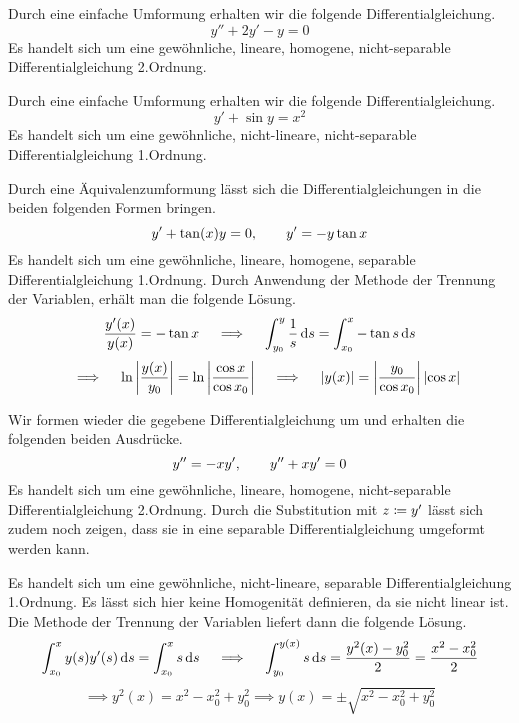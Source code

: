 \begin{atiSolution}
	\begin{atiSubtaskSolutions}
		\item[\localref{dgl1}]{
			Durch eine einfache Umformung erhalten wir die folgende Differentialgleichung.
			\[
				y'' + 2y' -y = 0
			\]
			Es handelt sich um eine gewöhnliche, lineare, homogene, nicht-separable Differentialgleichung 2.Ordnung.
		}
		\item[\localref{dgl2}]{
			Durch eine einfache Umformung erhalten wir die folgende Differentialgleichung.
			\[
				y'+ \sin y = x^2
			\]
			Es handelt sich um eine gewöhnliche, nicht-lineare, nicht-separable Differentialgleichung 1.Ordnung.
		}
		\item[\localref{dgl3}]{
			Durch eine Äquivalenzumformung lässt sich die Differentialgleichungen in die beiden folgenden Formen bringen.
			\[
				y' + \tan (x)y = 0 ,\qquad y' = -y\tan x
			\]
			Es handelt sich um eine gewöhnliche, lineare, homogene, separable Differentialgleichung 1.Ordnung.
			Durch Anwendung der Methode der Trennung der Variablen, erhält man die folgende Lösung.
			\[
				\frac{y'(x)}{y(x)} = -\tan x \implies \integral{y_0}{y}{\frac{1}{s}}{s} = \integral{x_0}{x}{-\tan s}{s}
			\]
			\[
				\implies \ln\abs{\frac{y(x)}{y_0}} = \ln\abs{\frac{\cos x}{\cos x_0}} \implies \abs{y(x)} = \abs{\frac{y_0}{\cos x_0}} \abs{\cos x}
			\]
		}
		\item[\localref{dgl4}]{
			Wir formen wieder die gegebene Differentialgleichung um und erhalten die folgenden beiden Ausdrücke.
			\[
				y'' = -xy' ,\qquad y'' + xy' = 0
			\]
			Es handelt sich um eine gewöhnliche, lineare, homogene, nicht-separable Differentialgleichung 2.Ordnung.
			Durch die Substitution mit $z\coloneqq y'$ lässt sich zudem noch zeigen, dass sie in eine separable Differentialgleichung umgeformt werden kann.
		}
		\item[\localref{dgl5}]{
			Es handelt sich um eine gewöhnliche, nicht-lineare, separable Differentialgleichung 1.Ordnung.
			Es lässt sich hier keine Homogenität definieren, da sie nicht linear ist.
			Die Methode der Trennung der Variablen liefert dann die folgende Lösung.
			\[
				\integral{x_0}{x}{y(s)y'(s)}{s} = \integral{x_0}{x}{s}{s} \implies \integral{y_0}{y(x)}{s}{s} = \frac{y^2(x)- y^2_0}{2} = \frac{x^2-x_0^2}{2}
			\]
			\[
				\implies y^2(x) = x^2 - x_0^2 + y_0^2 \implies y(x) = \pm\sqrt{x^2-x_0^2+y_0^2}
			\]

}
\end{atiSubtaskSolutions}
\end{atiSolution}
